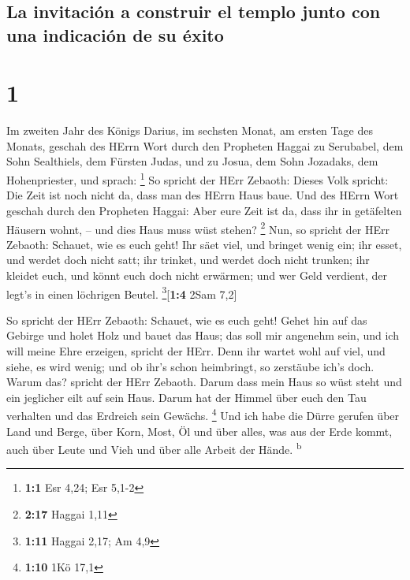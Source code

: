 \hypertarget{la-invitaciuxf3n-a-construir-el-templo-junto-con-una-indicaciuxf3n-de-su-uxe9xito}{%
\subsection{La invitación a construir el templo junto con una indicación
de su
éxito}\label{la-invitaciuxf3n-a-construir-el-templo-junto-con-una-indicaciuxf3n-de-su-uxe9xito}}

\hypertarget{section}{%
\section{1}\label{section}}

 Im zweiten Jahr des Königs Darius, im sechsten Monat, am
ersten Tage des Monats, geschah des HErrn Wort durch den Propheten
Haggai zu Serubabel, dem Sohn Sealthiels, dem Fürsten Judas, und zu
Josua, dem Sohn Jozadaks, dem Hohenpriester, und sprach: \footnote{\textbf{1:1}
  Esr 4,24; Esr 5,1-2}  So spricht der HErr Zebaoth:
Dieses Volk spricht: Die Zeit ist noch nicht da, dass man des HErrn Haus
baue.  Und des HErrn Wort geschah durch den Propheten
Haggai:  Aber eure Zeit ist da, dass ihr in getäfelten
Häusern wohnt, -- und dies Haus muss wüst stehen? \footnote{\textbf{2:17}
  Haggai 1,11}  Nun, so spricht der HErr Zebaoth: Schauet,
wie es euch geht!  Ihr säet viel, und bringet wenig ein;
ihr esset, und werdet doch nicht satt; ihr trinket, und werdet doch
nicht trunken; ihr kleidet euch, und könnt euch doch nicht erwärmen; und
wer Geld verdient, der legt's in einen löchrigen Beutel.
\footnote{\textbf{1:11} Haggai 2,17; Am 4,9}{[}\textbf{1:4} 2Sam 7,2{]}

 So spricht der HErr Zebaoth: Schauet, wie es euch geht!
 Gehet hin auf das Gebirge und holet Holz und bauet das
Haus; das soll mir angenehm sein, und ich will meine Ehre erzeigen,
spricht der HErr.  Denn ihr wartet wohl auf viel, und
siehe, es wird wenig; und ob ihr's schon heimbringt, so zerstäube ich's
doch. Warum das? spricht der HErr Zebaoth. Darum dass mein Haus so wüst
steht und ein jeglicher eilt auf sein Haus.  Darum hat
der Himmel über euch den Tau verhalten und das Erdreich sein Gewächs.
\footnote{\textbf{1:10} 1Kö 17,1}  Und ich habe die Dürre
gerufen über Land und Berge, über Korn, Most, Öl und über alles, was aus
der Erde kommt, auch über Leute und Vieh und über alle Arbeit der Hände.
\textsuperscript{b}

